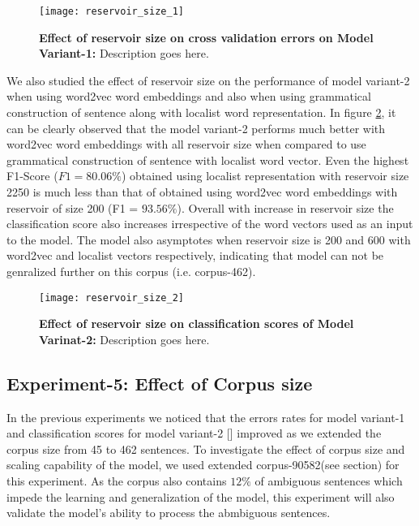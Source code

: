 \begin{figure}[hbtp]
\centering
\texttt{[image: reservoir\_size\_1]}
\caption{\textbf{Effect of reservoir size on cross validation errors on Model Variant-1:} Description goes here.}
\label{fig:reservoir_size_1}
\end{figure}

We also studied the effect of reservoir size on the performance of model variant-2 when using word2vec word embeddings and also when using grammatical construction of sentence along with localist word representation. In figure \ref{fig:reservoir_size_2}, it can be clearly observed that the model variant-2 performs much better with word2vec word embeddings with all reservoir size when compared to use grammatical construction of sentence with localist word vector. Even the highest F1-Score ($F1 = 80.06 \%$) obtained using localist representation with reservoir size 2250 is much less than that of obtained using word2vec word embeddings with reservoir of size 200 (F1 = $ 93.56\%$). Overall with increase in reservoir size the classification score also increases irrespective of the word vectors used as an input to the model. The model also asymptotes when reservoir size is 200 and 600 with word2vec and localist vectors respectively, indicating that model can not be genralized further on this corpus (i.e. corpus-462). 

\begin{figure}[hbtp]
\centering
\texttt{[image: reservoir\_size\_2]}
\caption{\textbf{Effect of reservoir size on classification scores of Model Varinat-2:} Description goes here.}
\label{fig:reservoir_size_2}
\end{figure}




\subsection{Experiment-5: Effect of Corpus size}

In the previous experiments we noticed that the errors rates for model variant-1 and classification scores for model variant-2 [] improved as we extended the corpus size from 45 to 462 sentences. To investigate the effect of corpus size and scaling capability of the model, we used extended corpus-90582(see section) for this experiment. As the corpus also contains $12\%$ of ambiguous sentences which impede the learning and generalization of the model, this experiment will also validate the model's ability to process the abmbiguous sentences.

